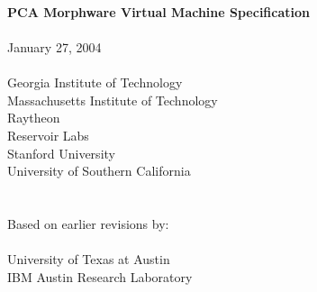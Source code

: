 \documentclass[10pt]{article}
\begin{document}
  \begin{titlepage}
    \begin{center}
      {\LARGE
	~ \\ ~ \\ ~ \\ ~ \\ ~ \\ ~ \\ ~ \\ ~ \\
	{\bf PCA Morphware Virtual Machine Specification \\ ~ \\}
      }
      {\Large
	January 27, 2004 \\ ~ \\
      }
      {\large
	Georgia Institute of Technology \\
	Massachusetts Institute of Technology \\ Raytheon \\ Reservoir Labs \\ Stanford University \\ University of Southern California \\ ~ \\ ~ \\ 
	Based on earlier revisions by: \\ ~ \vspace{-8pt} \\
	University of Texas at Austin \\ IBM Austin Research Laboratory
      }
    \end{center}
  \end{titlepage}

  \newcommand{\mt}[1]{\mbox{\it #1}}
  \newcommand{\todo}[1]{\framebox{\bf #1}}
  \newcommand{\sss}[1]{\medskip \noindent {\bf #1} \smallskip}
  \newcommand{\ssss}[1]{\medskip \noindent {\bf #1:}}
  \newcommand{\makeline}[0]{\rule{0cm}{0cm}\\\hrule\rule{0cm}{0cm}}

  \newcommand{\lp}[2]{\raisebox{-6pt}{\parbox{#1}{#2 \vspace{2pt}}}}
  \newcommand{\lpp}[2]{\raisebox{-13pt}{\parbox{#1}{#2 \vspace{2pt}}}}

  \newcommand{\name}[1]{

    \medskip \noindent {\bf #1}
  }

  \newcommand{\decl}[1]{

    \medskip \noindent {\tt #1} \medskip
  }
\end{document}
